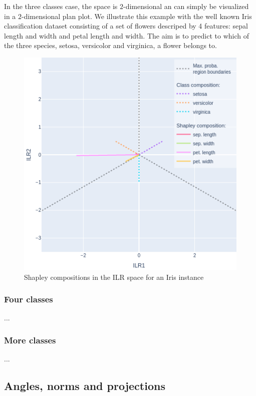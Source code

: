 \documentclass{article}
\theoremstyle{plain}
\theoremstyle{definition}
\theoremstyle{remark}
\begin{document}
In the three classes case, the space is $2$-dimensional an can simply be visualized in a $2$-dimensional plan plot. We illustrate this example with the well known Iris classification dataset consisting of a set of flowers descriped by 4 features: sepal length and width and petal length and width. The aim is to predict to which of the three species, setosa, versicolor and virginica, a flower belongs to.
\begin{figure}
  \centering
    \includegraphics[width=\linewidth]{figures/3classes/ilrplot.png}
  \caption{Shapley compositions in the ILR space for an Iris instance}
  \label{fig:3classes}
\end{figure}

\subsubsection{Four classes}

...
\subsubsection{More classes}
\label{sec:more}
...

\subsection{Angles, norms and projections}
\end{document}
